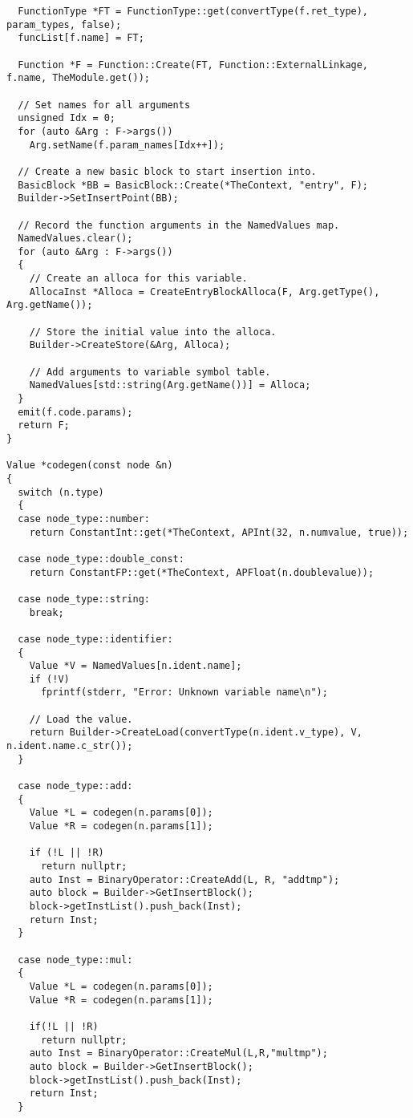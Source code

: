 \documentclass[english,a4paper,12pt]{report}
\begin{document}
\begin{lstlisting}
  FunctionType *FT = FunctionType::get(convertType(f.ret_type), param_types, false);
  funcList[f.name] = FT;

  Function *F = Function::Create(FT, Function::ExternalLinkage, f.name, TheModule.get());

  // Set names for all arguments
  unsigned Idx = 0;
  for (auto &Arg : F->args())
    Arg.setName(f.param_names[Idx++]);

  // Create a new basic block to start insertion into.
  BasicBlock *BB = BasicBlock::Create(*TheContext, "entry", F);
  Builder->SetInsertPoint(BB);

  // Record the function arguments in the NamedValues map.
  NamedValues.clear();
  for (auto &Arg : F->args())
  {
    // Create an alloca for this variable.
    AllocaInst *Alloca = CreateEntryBlockAlloca(F, Arg.getType(), Arg.getName());

    // Store the initial value into the alloca.
    Builder->CreateStore(&Arg, Alloca);

    // Add arguments to variable symbol table.
    NamedValues[std::string(Arg.getName())] = Alloca;
  }
  emit(f.code.params);
  return F;
}

Value *codegen(const node &n)
{
  switch (n.type)
  {
  case node_type::number:
    return ConstantInt::get(*TheContext, APInt(32, n.numvalue, true));

  case node_type::double_const:
    return ConstantFP::get(*TheContext, APFloat(n.doublevalue));

  case node_type::string:
    break;

  case node_type::identifier:
  {
    Value *V = NamedValues[n.ident.name];
    if (!V)
      fprintf(stderr, "Error: Unknown variable name\n");

    // Load the value.
    return Builder->CreateLoad(convertType(n.ident.v_type), V, n.ident.name.c_str());
  }

  case node_type::add:
  {
    Value *L = codegen(n.params[0]);
    Value *R = codegen(n.params[1]);

    if (!L || !R)
      return nullptr;
    auto Inst = BinaryOperator::CreateAdd(L, R, "addtmp");
    auto block = Builder->GetInsertBlock();
    block->getInstList().push_back(Inst);
    return Inst;
  }

  case node_type::mul:
  {
    Value *L = codegen(n.params[0]);
    Value *R = codegen(n.params[1]);
    
    if(!L || !R)
      return nullptr;
    auto Inst = BinaryOperator::CreateMul(L,R,"multmp");
    auto block = Builder->GetInsertBlock();
    block->getInstList().push_back(Inst);
    return Inst;
  }


\end{lstlisting}
\end{document}

